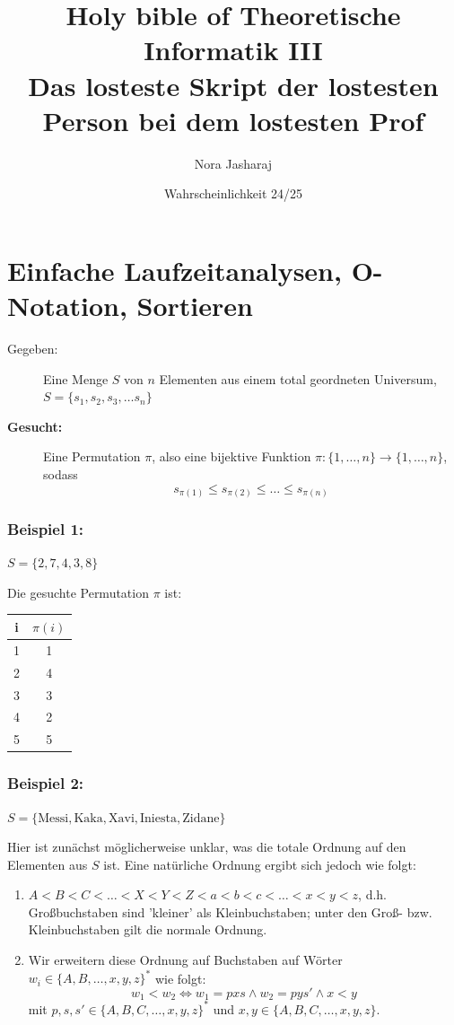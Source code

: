 \documentclass{article}
\begin{document}
\title{Holy bible of Theoretische Informatik III \\ Das losteste Skript der lostesten Person bei dem lostesten Prof}
\date{Wahrscheinlichkeit 24/25}
\author{Nora Jasharaj}
\maketitle
\newpage
\tableofcontents
\newpage
\section{Einfache Laufzeitanalysen, O-Notation, Sortieren}

\begin{description}
\item[Gegeben:] Eine Menge $S$ von $n$ Elementen aus einem total geordneten Universum,
	$S=\{s_1, s_2, s_3, \dots s_n\}$
\item[\bf Gesucht:] Eine Permutation $\pi$, also eine bijektive Funktion 
	$\pi:\{1,\dots,n\}\rightarrow\{1,\dots,n\}$, sodass
	\[
		s_{\pi(1)}\leq s_{\pi(2)}\leq \dots \leq s_{\pi(n)}
	\]
\end{description}




\subsubsection{Beispiel 1:}
$S=\{2,7,4,3,8\}$

Die gesuchte Permutation $\pi$ ist:
\hspace{2cm}
\begin{tabular}{c|c}
i & $\pi(i)$	\\
\hline
1 & 1\\
2 & 4\\
3 & 3\\
4 & 2\\
5 & 5\\
\end{tabular}


\subsubsection{Beispiel 2:}

$S=\{\mbox{Messi}, \mbox{Kaka}, \mbox{Xavi}, \mbox{Iniesta}, \mbox{Zidane}\}$

Hier ist zunächst möglicherweise unklar, was die totale Ordnung auf den Elementen aus
$S$ ist. Eine natürliche Ordnung ergibt sich jedoch wie folgt: 
\begin{enumerate}
\item $A<B<C<\dots<X<Y<Z<a<b<c<\dots<x<y<z$, d.h. Großbuchstaben sind 'kleiner' als Kleinbuchstaben;
	unter den Groß- bzw. Kleinbuchstaben gilt die normale Ordnung.
\item Wir erweitern diese Ordnung auf Buchstaben auf Wörter $w_i\in \{A,B,\dots, x,y,z\}^*$ wie folgt:
	\[
		w_1<w_2 \Leftrightarrow w_1=p x s \wedge w_2=p y s' \wedge x<y
	\]
	mit $p,s,s'\in \{A,B,C,\dots,x,y,z\}^*$ und $x,y\in \{A,B,C,\dots,x,y,z\}$. 
\end{enumerate}
\end{document}
